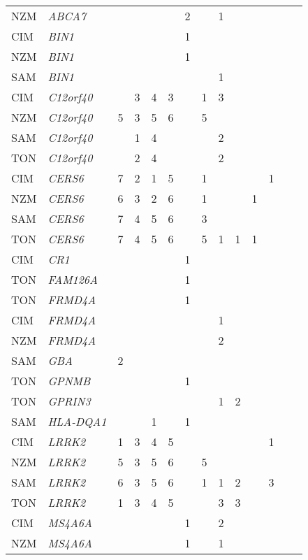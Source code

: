 \documentclass[twoside,openright]{report}
\begin{document}
\begin{ThreePartTable}
\begin{longtable}[t]{llllllllllllll}
NZM & \em{ABCA7} &  &  &  &  & 2 &  & 1 &  &  &  &  & \\
CIM & \em{BIN1} &  &  &  &  & 1 &  &  &  &  &  &  & \\
NZM & \em{BIN1} &  &  &  &  & 1 &  &  &  &  &  &  & \\
SAM & \em{BIN1} &  &  &  &  &  &  & 1 &  &  &  &  & \\
CIM & \em{C12orf40} &  & 3 & 4 & 3 &  & 1 & 3 &  &  &  &  & \\
NZM & \em{C12orf40} & 5 & 3 & 5 & 6 &  & 5 &  &  &  &  &  & \\
SAM & \em{C12orf40} &  & 1 & 4 &  &  &  & 2 &  &  &  &  & \\
TON & \em{C12orf40} &  & 2 & 4 &  &  &  & 2 &  &  &  &  & \\
CIM & \em{CERS6} & 7 & 2 & 1 & 5 &  & 1 &  &  &  & 1 &  & \\
NZM & \em{CERS6} & 6 & 3 & 2 & 6 &  & 1 &  &  & 1 &  &  & \\
SAM & \em{CERS6} & 7 & 4 & 5 & 6 &  & 3 &  &  &  &  &  & \\
TON & \em{CERS6} & 7 & 4 & 5 & 6 &  & 5 & 1 & 1 & 1 &  &  & \\
CIM & \em{CR1} &  &  &  &  & 1 &  &  &  &  &  &  & \\
TON & \em{FAM126A} &  &  &  &  & 1 &  &  &  &  &  &  & \\
TON & \em{FRMD4A} &  &  &  &  & 1 &  &  &  &  &  &  & \\
CIM & \em{FRMD4A} &  &  &  &  &  &  & 1 &  &  &  &  & \\
NZM & \em{FRMD4A} &  &  &  &  &  &  & 2 &  &  &  &  & \\
SAM & \em{GBA} & 2 &  &  &  &  &  &  &  &  &  &  & \\
TON & \em{GPNMB} &  &  &  &  & 1 &  &  &  &  &  &  & \\
TON & \em{GPRIN3} &  &  &  &  &  &  & 1 & 2 &  &  &  & \\
SAM & \em{HLA-DQA1} &  &  & 1 &  & 1 &  &  &  &  &  &  & \\
CIM & \em{LRRK2} & 1 & 3 & 4 & 5 &  &  &  &  &  & 1 &  & \\
NZM & \em{LRRK2} & 5 & 3 & 5 & 6 &  & 5 &  &  &  &  &  & \\
SAM & \em{LRRK2} & 6 & 3 & 5 & 6 &  & 1 & 1 & 2 &  & 3 &  & \\
TON & \em{LRRK2} & 1 & 3 & 4 & 5 &  &  & 3 & 3 &  &  &  & \\
CIM & \em{MS4A6A} &  &  &  &  & 1 &  & 2 &  &  &  &  & \\
NZM & \em{MS4A6A} &  &  &  &  & 1 &  & 1 &  &  &  &  & \\

\end{longtable}
\end{ThreePartTable}
\end{document}
